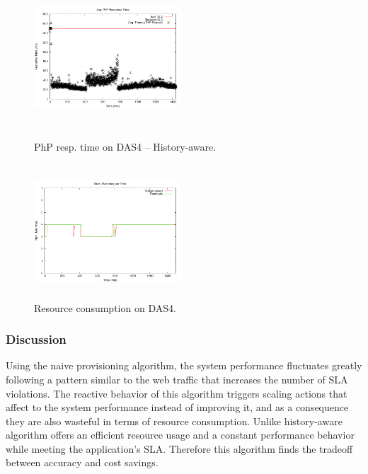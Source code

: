 \begin{figure}
\begin{center}
\includegraphics[width=0.49\textwidth, height=6cm]{./images/homogeneous/avgTimeout_PhP_history}
\end{center}
\caption{PhP resp. time on DAS4 -- History-aware.}
\label{historyDas4}
\end{figure}

\begin{figure}
\begin{center}
\includegraphics[width=0.49\textwidth, height=5cm]{./images/homogeneous/numMachinesComp}
\end{center}
\caption{Resource consumption on DAS4.}
\label{resComDas4}
\end{figure}

\subsubsection{Discussion}

Using the naive provisioning algorithm, the system performance fluctuates greatly following a pattern similar to the web traffic that increases the number of SLA violations. The reactive behavior of this algorithm triggers scaling actions that affect to the system performance instead of improving it, and as a consequence they are also wasteful in terms of resource consumption. Unlike history-aware algorithm offers an efficient resource usage and a constant performance behavior while meeting the application's SLA. Therefore this algorithm finds the tradeoff between accuracy and cost savings.

